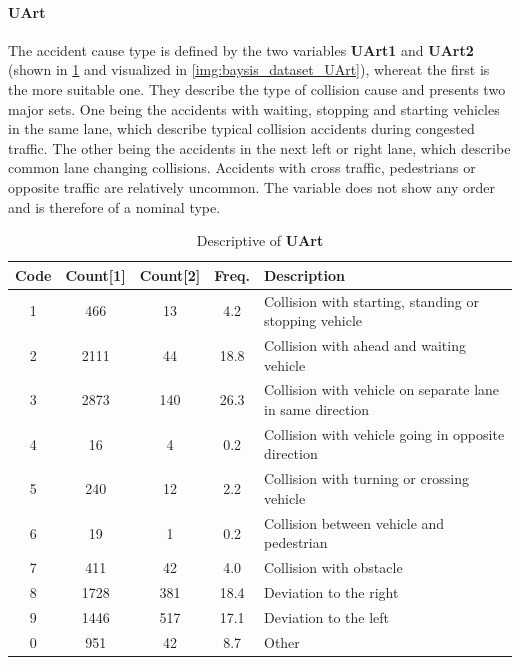 \paragraph{UArt}
\label{baysis_dataset_UArt}
The accident cause type is defined by the two variables \textbf{UArt1} and \textbf{UArt2} (shown in \cref{tbl:baysis_dataset_UArt} and visualized in \cref{img:baysis_dataset_UArt}), whereat the first is the more suitable one. They describe the type of collision cause and presents two major sets. One being the accidents with waiting, stopping and starting vehicles in the same lane, which describe typical collision accidents during congested traffic. The other being the accidents in the next left or right lane, which describe common lane changing collisions. Accidents with cross traffic, pedestrians or opposite traffic are relatively uncommon. The variable does not show any order and is therefore of a nominal type.
\begin{table}[ht]
	\centering
	\small
	\begin{tabular}{c|c|c|c|l} 
		\toprule
		Code & Count[1] & Count[2] & Freq. & Description \\ 
		\midrule
 		1 & 466		& 13	& 4.2  & Collision with starting, standing or stopping vehicle  \\ 
 		2 & 2111	& 44 	& 18.8 & Collision with ahead and waiting vehicle  \\
 		3 & 2873	& 140	& 26.3 & Collision with vehicle on separate lane in same direction  \\
 		4 &	16		& 4		& 0.2   & Collision with vehicle going in opposite direction  \\
 		5 & 240		& 12	& 2.2  & Collision with turning or crossing vehicle  \\
 		6 & 19		& 1		& 0.2   & Collision between vehicle and pedestrian  \\
 		7 & 411		& 42	& 4.0  & Collision with obstacle  \\
 		8 & 1728	& 381	& 18.4 & Deviation to the right  \\
 		9 & 1446	& 517	& 17.1 & Deviation to the left  \\
		0 & 951		& 42	& 8.7  & Other  \\
		\bottomrule
	\end{tabular}
	\caption{Descriptive of \textbf{UArt}}
	\label{tbl:baysis_dataset_UArt}
\end{table}
